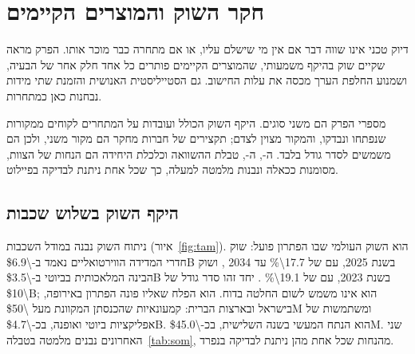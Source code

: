 \chapter{חקר השוק והמוצרים הקיימים}
\label{ch:market}

\begin{managerbox}
דיוק טכני אינו שווה דבר אם אין מי שישלם עליו, או אם מתחרה כבר מוכר אותו. הפרק מראה שקיים שוק בהיקף משמעותי, שהמוצרים הקיימים פותרים כל אחד חלק אחר של הבעיה, ושמנוע החלפת הערך מכסה את עלות החישוב. גם הסטייליסטית האנושית והזמנת שתי מידות נבחנות כאן כמתחרות.
\end{managerbox}

\begin{warningbox}
מספרי הפרק הם משני סוגים. היקף השוק הכולל ועובדות על המתחרים לקוחים ממקורות שנפתחו ונבדקו, והמקור מצוין לצדם; תקצירים של חברות מחקר הם מקור משני, ולכן הם משמשים לסדר גודל בלבד. ה-, ה-, טבלת ההשוואה וכלכלת היחידה הם הנחות של הצוות, מסומנות ככאלה ונבנות מלמטה למעלה, כך שכל אחת ניתנת לבדיקה בפיילוט.
\end{warningbox}

\section{היקף השוק בשלוש שכבות}
\label{sec:tam}

ניתוח השוק נבנה במודל השכבות (איור~\ref{fig:tam}).  הוא השוק העולמי שבו הפתרון פועל: שוק חדרי המדידה הווירטואליים נאמד ב-\num{\$6.9B} בשנת \num{2025}, עם  של \num{17.7\%} עד \num{2034} \cite{fbi2026vfr}, ושוק הבינה המלאכותית בביוטי ב-\num{\$3.5B} בשנת \num{2023}, עם  של \num{19.1\%} \cite{kings2024aibeauty}. יחד זהו סדר גודל של \num{\$10B}; הוא אינו משמש לשום החלטה בדוח.  הוא הפלח שאליו פונה הפתרון באירופה, בישראל ובארצות הברית: קמעונאיות שהכנסתן המקוונת מעל \num{\$50M} ומשתמשות של אפליקציות ביוטי ואופנה, בכ-\num{\$4.7B}.  הוא הנתח המעשי בשנה השלישית, בכ-\num{\$45.0M}. שני האחרונים נבנים מלמטה בטבלה~\ref{tab:som}, מהנחות שכל אחת מהן ניתנת לבדיקה בנפרד.

